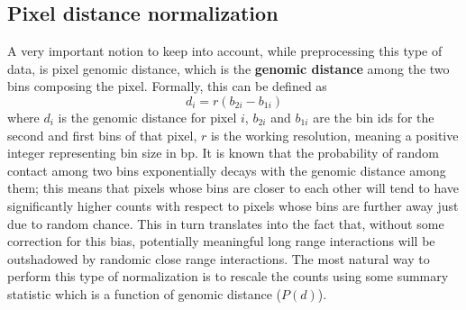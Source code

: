 \subsection{Pixel distance normalization}

A very important notion to keep into account, while preprocessing this type of data, is pixel genomic distance, which is the \textbf{genomic distance} among the two bins composing the pixel. Formally, this can be defined as 
$$d_i = r(b_{2i} - b_{1i})$$
where $d_i$ is the genomic distance for pixel $i$, $b_{2i}$ and $b_{1i}$ are the bin ids for the second and first bins of that pixel, $r$ is the working resolution, meaning a positive integer representing bin size in bp. It is known that the probability of random contact among two bins exponentially decays with the genomic distance among them\cite{distancedecay2009}; this means that pixels whose bins are closer to each other will tend to have significantly higher counts with respect to pixels whose bins are further away just due to random chance. This in turn translates into the fact that, without some correction for this bias, potentially meaningful long range interactions will be outshadowed by randomic close range interactions. The most natural way to perform this type of normalization is to rescale the counts using some summary statistic which is a function of genomic distance ($P(d)$).

